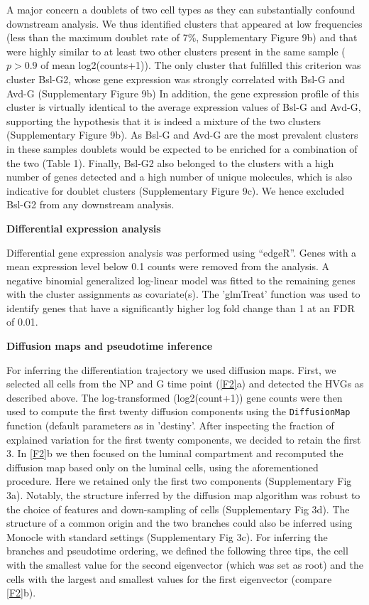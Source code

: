 \documentclass[titlepage, 12pt, oneside]{amsart}
\begin{document}
A major concern a doublets of two cell types as they can substantially confound downstream analysis.
We thus identified clusters that appeared at low frequencies (less than the maximum doublet rate of 7\%, Supplementary Figure 9b) and that were highly similar to at least two other clusters present in the same sample ($p > 0.9$ of mean log2(counts+1)).
The only cluster that fulfilled this criterion was cluster Bsl-G2, whose gene expression was strongly correlated with Bsl-G and Avd-G (Supplementary Figure 9b)
In addition, the gene expression profile of this cluster is virtually identical to the average expression values of Bsl-G and Avd-G, supporting the hypothesis that it is indeed a mixture of the two clusters (Supplementary Figure 9b).
As Bsl-G and Avd-G are the most prevalent clusters in these samples doublets would be expected to be enriched for a combination of the two (Table 1).
Finally, Bsl-G2 also belonged to the clusters with a high number of genes detected and a high number of unique molecules, which is also indicative for doublet clusters (Supplementary Figure 9c).
We hence excluded Bsl-G2 from any downstream analysis.


\textbf{Differential expression analysis }

Differential gene expression analysis was performed using ``edgeR''\autocite{Robinson2010}.
Genes with a mean expression level below 0.1 counts were removed from the analysis.
A negative binomial generalized log-linear model was fitted to the remaining genes with the cluster assignments as covariate(s).
The 'glmTreat' function was used to identify genes that have a significantly higher log fold change than 1 at an FDR of 0.01.

\textbf{Diffusion maps and pseudotime inference}

For inferring the differentiation trajectory we used diffusion maps.
First, we selected all cells from the NP and G time point (\autoref{F2}a) and detected the HVGs as described above.
The log-transformed (log2(count+1)) gene counts were then used to compute the first twenty diffusion components using the \texttt{DiffusionMap} function (default parameters as in 'destiny'\autocite{Angerer2016}.
After inspecting the fraction of explained variation for the first twenty components, we decided to retain the first 3.
In \autoref{F2}b we then focused on the luminal compartment and recomputed the diffusion map based only on the luminal cells, using the aforementioned procedure.
Here we retained only the first two components (Supplementary Fig 3a).
Notably, the structure inferred by the diffusion map algorithm was robust to the choice of features and down-sampling of cells (Supplementary Fig 3d).
The structure of a common origin and the two branches could also be inferred using Monocle with standard settings\autocite{Trapnell2014} (Supplementary Fig 3c).
For inferring the branches and pseudotime ordering, we defined the following three tips, the cell with the smallest value for the second eigenvector (which was set as root) and the cells with the largest and smallest values for the first eigenvector (compare \autoref{F2}b).  
\end{document}
